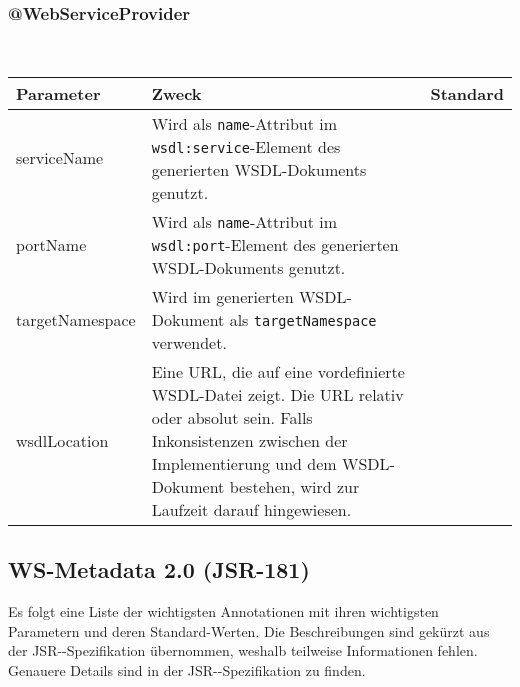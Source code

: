 \documentclass[runningheads]{llncs}
\newcommand{\germanquote}[1]{\glqq{}#1\grqq{}}
\newcommand{\anntabwidth}{\textwidth}
\begin{document}
    \subsubsection{@WebServiceProvider}\ \\
    \tymin=75pt
    \begin{tabulary}{\anntabwidth}{|l|L|L|}
    \hline
    \textbf{Parameter} & \textbf{Zweck} & \textbf{Standard} \\
    \hline
      serviceName &
      Wird als \texttt{name}-Attribut im \texttt{wsdl:service}-Element des generierten WSDL-\linebreak[0]Dokuments genutzt. &
      \germanquote{} \\
    \hline
      portName &
      Wird als \texttt{name}-Attribut im \texttt{wsdl:port}-Element des generierten WSDL-\linebreak[0]Dokuments genutzt. &
      \germanquote{} \\
    \hline
      targetNamespace &
      Wird im generierten WSDL-Dokument als \texttt{targetNamespace} verwendet. &
      \germanquote{} \\
    \hline
      wsdlLocation &
      Eine URL, die auf eine vordefinierte WSDL-Datei zeigt. Die URL relativ oder absolut sein. Falls Inkonsistenzen zwischen der Implementierung und dem WSDL-Dokument bestehen, wird zur Laufzeit darauf hingewiesen. &
      \germanquote{} \\
    \hline
    \end{tabulary}
    \tymin=10pt

  \label{jsr181}
  \subsection{WS-Metadata 2.0 (JSR-181)}
  \nocite{jsr_181}

    Es folgt eine Liste der wichtigsten Annotationen mit ihren wichtigsten Parametern und deren Standard-Werten. Die Beschreibungen sind gekürzt aus der JSR--\linebreak[0]Spezifikation\cite{jsr_181} übernommen, weshalb teilweise Informationen fehlen. Genauere Details sind in der JSR--\linebreak[0]Spezifikation\cite{jsr_181} zu finden.\\ \vfill
\end{document}
